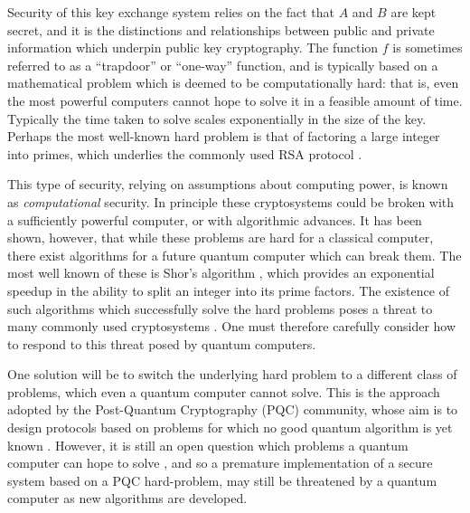Security of this key exchange system relies on the fact that $A$ and $B$ are kept secret, and it is the distinctions and relationships between public and private information which underpin public key cryptography. The function $f$ is sometimes referred to as a ``trapdoor'' or ``one-way'' function, and is typically based on a mathematical problem which is deemed to be computationally hard: that is, even the most powerful computers cannot hope to solve it in a feasible amount of time. Typically the time taken to solve scales exponentially in the size of the key. Perhaps the most well-known hard problem is that of factoring a large integer into primes, which underlies the commonly used RSA protocol \cite{Rivest1978, Schneier1996}.




This type of security, relying on assumptions about computing power, is known as \emph{computational} security. In principle these cryptosystems could be broken with a sufficiently powerful computer, or with algorithmic advances. It has been shown, however, that while these problems are hard for a classical computer, there exist algorithms for a future quantum computer which can break them. The most well known of these is Shor's algorithm \cite{Shor1997},  which provides an exponential speedup in the ability to split an integer into its prime factors. %
The existence of such algorithms which successfully solve the hard problems poses a threat to many commonly used cryptosystems %
\cite{Rivest1978, Schneier1996, Amiri2015, Nielsen2010, Shor1997}. One must therefore carefully consider how to respond to this threat posed by quantum computers. 

One solution will be to switch the underlying hard problem to a different class of problems, which even a quantum computer cannot solve. This is the approach adopted by the Post-Quantum Cryptography (PQC) community, whose aim is to design protocols based on problems for which no good quantum algorithm is yet known \cite{Bernstein2017, Chen2016, Gagliardoni2017a, Bernstein2009, Alagic2019, Chrome2016}. However, it is still an open question which problems a quantum computer can hope to solve%
, and so a premature implementation of a secure system based on a PQC hard-problem, may still be threatened by a quantum computer as new algorithms are developed. 

